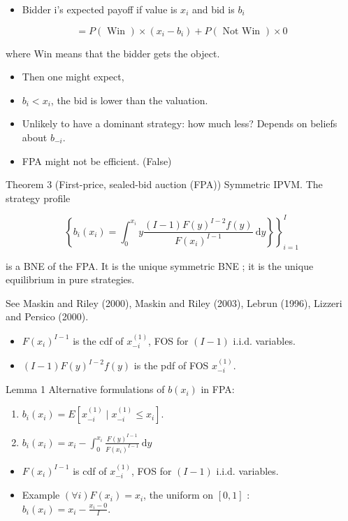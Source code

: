 \documentclass[10pt]{article}
\begin{document}
\begin{itemize}
  \item Bidder i's expected payoff if value is $x_{i}$ and bid is $b_{i}$
\end{itemize}

$$
=P(\text { Win }) \times\left(x_{i}-b_{i}\right)+P(\text { Not Win }) \times 0
$$

where Win means that the bidder gets the object.

\begin{itemize}
  \item Then one might expect,
  \item $b_{i}<x_{i}$, the bid is lower than the valuation.
  \item Unlikely to have a dominant strategy: how much less? Depends on beliefs about $b_{-i}$.
  \item FPA might not be efficient. (False)
\end{itemize}

Theorem 3 (First-price, sealed-bid auction (FPA)) Symmetric IPVM. The strategy profile

$$
\left.\left\{b_{i}\left(x_{i}\right)=\int_{0}^{x_{i}} y \frac{(I-1) F(y)^{I-2} f(y)}{F\left(x_{i}\right)^{I-1}} \mathrm{~d} y\right\}\right\}_{i=1}^{I}
$$

is a BNE of the FPA. It is the unique symmetric BNE ; it is the unique equilibrium in pure strategies.

See Maskin and Riley (2000), Maskin and Riley (2003), Lebrun (1996), Lizzeri and Persico (2000).

\begin{itemize}
  \item $F\left(x_{i}\right)^{I-1}$ is the cdf of $x_{-i}^{(1)}$, FOS for $(I-1)$ i.i.d. variables.
  \item $(I-1) F(y)^{I-2} f(y)$ is the pdf of FOS $x_{-i}^{(1)}$.
\end{itemize}

Lemma 1 Alternative formulations of $b\left(x_{i}\right)$ in FPA:

\begin{enumerate}
  \item $b_{i}\left(x_{i}\right)=E\left[x_{-i}^{(1)} \mid x_{-i}^{(1)} \leq x_{i}\right]$.
  \item $b_{i}\left(x_{i}\right)=x_{i}-\int_{0}^{x_{i}} \frac{F(y)^{I-1}}{F\left(x_{i}\right)^{I-1}} \mathrm{~d} y$
\end{enumerate}

\begin{itemize}
  \item $F\left(x_{i}\right)^{I-1}$ is cdf of $x_{-i}^{(1)}$, FOS for $(I-1)$ i.i.d. variables.
  \item Example $(\forall i) F\left(x_{i}\right)=x_{i}$, the uniform on $[0,1]$ :\\
$b_{i}\left(x_{i}\right)=x_{i}-\frac{x_{i}-0}{I}$.
\end{itemize}
\end{document}
